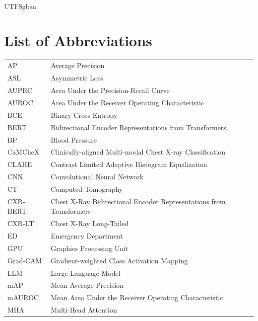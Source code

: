 \documentclass[13pt]{extarticle}
\begin{document}
\begin{CJK*}{UTF8}{gbsn}






\newpage


\section*{List of Abbreviations}
\vspace{0.6em}
\begin{table}[H]
    \centering
    \large 
    \begin{tabular}{ll}
        AP & Average Precision \\
        ASL & Asymmetric Loss \\
        AUPRC & Area Under the Precision-Recall Curve \\
        AUROC & Area Under the Receiver Operating Characteristic \\
        BCE & Binary Cross-Entropy \\
        BERT & Bidirectional Encoder Representations from Transformers \\
        BP & Blood Pressure \\
        CaMCheX & Clinically-aligned Multi-modal Chest X-ray Classification \\
        CLAHE & Contrast Limited Adaptive Histogram Equalization \\
        CNN & Convolutional Neural Network \\
        CT & Computed Tomography \\
        CXR-BERT & Chest X-Ray Bidirectional Encoder Representations from Transformers \\
        CXR-LT & Chest X-Ray Long-Tailed \\
        ED & Emergency Department \\
        GPU & Graphics Processing Unit \\
        Grad-CAM & Gradient-weighted Class Activation Mapping \\
        LLM & Large Language Model \\
        mAP & Mean Average Precision \\
        mAUROC & Mean Area Under the Receiver Operating Characteristic \\
        MHA & Multi-Head Attention \\

\end{tabular}
\end{table}
\end{CJK*}
\end{document}
